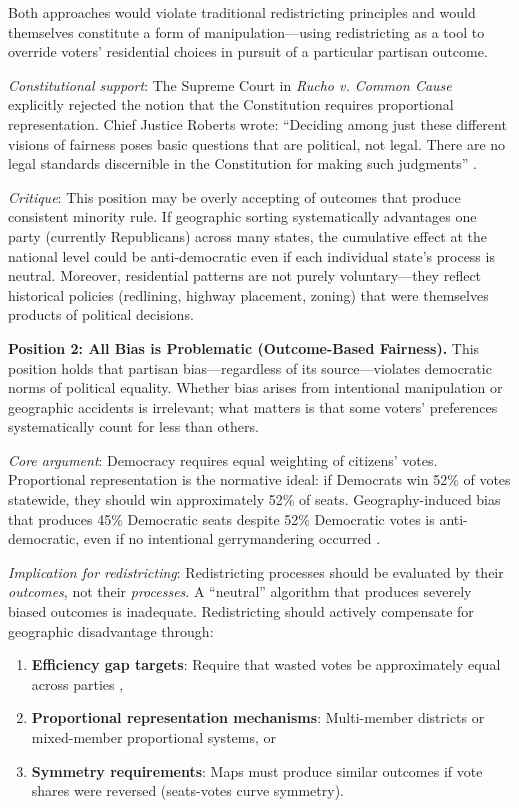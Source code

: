 Both approaches would violate traditional redistricting principles and would themselves constitute a form of manipulation---using redistricting as a tool to override voters' residential choices in pursuit of a particular partisan outcome.

\textit{Constitutional support}: The Supreme Court in \textit{Rucho v. Common Cause} explicitly rejected the notion that the Constitution requires proportional representation. Chief Justice Roberts wrote: ``Deciding among just these different visions of fairness poses basic questions that are political, not legal. There are no legal standards discernible in the Constitution for making such judgments'' \citep{rucho2019}.

\textit{Critique}: This position may be overly accepting of outcomes that produce consistent minority rule. If geographic sorting systematically advantages one party (currently Republicans) across many states, the cumulative effect at the national level could be anti-democratic even if each individual state's process is neutral. Moreover, residential patterns are not purely voluntary---they reflect historical policies (redlining, highway placement, zoning) that were themselves products of political decisions.

\textbf{Position 2: All Bias is Problematic (Outcome-Based Fairness).}
This position holds that partisan bias---regardless of its source---violates democratic norms of political equality. Whether bias arises from intentional manipulation or geographic accidents is irrelevant; what matters is that some voters' preferences systematically count for less than others.

\textit{Core argument}: Democracy requires equal weighting of citizens' votes. Proportional representation is the normative ideal: if Democrats win 52\% of votes statewide, they should win approximately 52\% of seats. Geography-induced bias that produces 45\% Democratic seats despite 52\% Democratic votes is anti-democratic, even if no intentional gerrymandering occurred \citep{mcgann2016}.

\textit{Implication for redistricting}: Redistricting processes should be evaluated by their \textit{outcomes}, not their \textit{processes}. A ``neutral'' algorithm that produces severely biased outcomes is inadequate. Redistricting should actively compensate for geographic disadvantage through:
\begin{enumerate}[label=(\alph*)]
\item \textbf{Efficiency gap targets}: Require that wasted votes be approximately equal across parties \citep{stephanopoulos2015},
\item \textbf{Proportional representation mechanisms}: Multi-member districts or mixed-member proportional systems, or
\item \textbf{Symmetry requirements}: Maps must produce similar outcomes if vote shares were reversed (seats-votes curve symmetry).
\end{enumerate}

